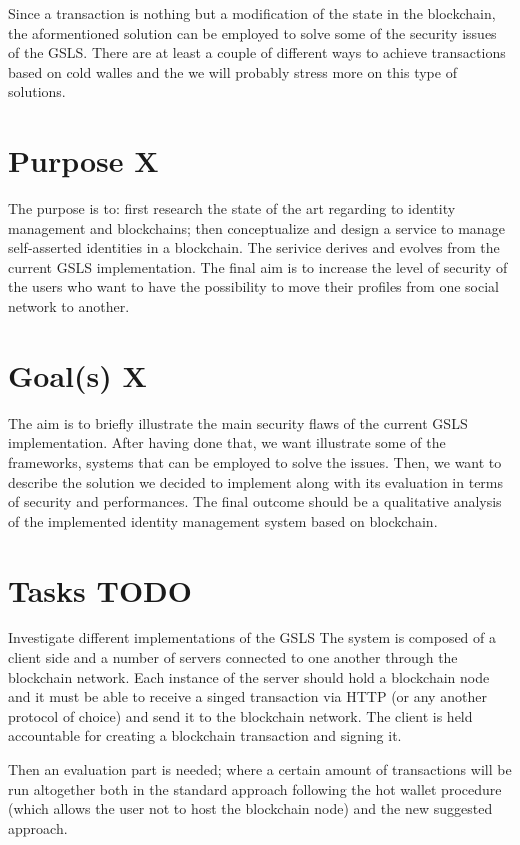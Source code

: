 \documentclass[paper=a4, fontsize=11pt]{scrartcl} %
\numberwithin{equation}{section} %
\numberwithin{figure}{section} %
\numberwithin{table}{section} %
\begin{document}
Since a transaction is nothing but a modification of the state in the blockchain, the aformentioned solution can be employed to solve some of the security issues of the GSLS. There are at least a couple of different ways to achieve transactions based on cold walles \cite{icebox} \cite{light-wallet} and the we will probably stress more on this type of solutions. 

\section{Purpose X}
The purpose is to: first research the state of the art regarding to identity management and blockchains; then conceptualize and design a service to manage self-asserted identities in a blockchain. The serivice derives and evolves from the current GSLS implementation. The final aim is to increase the level of security of the users who want to have the possibility to move their profiles from one social network to another. 

\section{Goal(s) X}
The aim is to briefly illustrate the main security flaws of the current GSLS implementation. After having done that, we want illustrate some of the frameworks, systems that can be employed to solve the issues. Then, we want to describe the solution we decided to implement along with its evaluation in terms of security and performances. The final outcome should be a qualitative analysis of the implemented identity management system based on blockchain. 

\section{Tasks TODO}

Investigate different implementations of the GSLS The system is composed of a client side and a number of servers connected to one another through the blockchain network. Each instance of the server should hold a blockchain node and it must be able to receive a singed transaction via HTTP (or any another protocol of choice) and send it to the blockchain network. The client is held accountable for creating a blockchain transaction and signing it.  

Then an evaluation part is needed; where a certain amount of transactions will be run altogether both in the standard approach following the hot wallet procedure (which allows the user not to host the blockchain node) and the new suggested approach.
\end{document}
